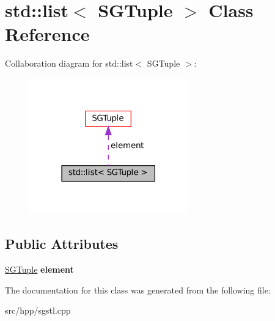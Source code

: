 \hypertarget{classstd_1_1list_3_01SGTuple_01_4}{}\section{std\+:\+:list$<$ S\+G\+Tuple $>$ Class Reference}
\label{classstd_1_1list_3_01SGTuple_01_4}


Collaboration diagram for std\+:\+:list$<$ S\+G\+Tuple $>$\+:
\nopagebreak
\begin{figure}[H]
\begin{center}
\leavevmode
\includegraphics[width=194pt]{classstd_1_1list_3_01SGTuple_01_4__coll__graph}
\end{center}
\end{figure}
\subsection*{Public Attributes}
\begin{DoxyCompactItemize}
\item 
\mbox{\label{classstd_1_1list_3_01SGTuple_01_4_ac4c14c4d995b52e5d3b08fd07b38f0af}} 
\hyperlink{classSGTuple}{S\+G\+Tuple} {\bfseries element}
\end{DoxyCompactItemize}


The documentation for this class was generated from the following file\+:\begin{DoxyCompactItemize}
\item 
src/hpp/sgstl.\+cpp\end{DoxyCompactItemize}
